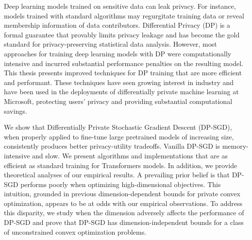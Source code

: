 
Deep learning models trained on sensitive data can leak privacy.
For instance, models trained with standard algorithms may regurgitate training data or reveal membership information of data contributors.
Differential Privacy (DP) is a formal guarantee that provably limits privacy leakage and has become the gold standard for privacy-preserving statistical data analysis.
However, most approaches for training deep learning models with DP were computationally intensive and incurred substantial performance penalties on the resulting model.
This thesis presents improved techniques for DP training that are more efficient and performant.
These techniques have seen growing interest in industry and have been used in the deployments of differentially private machine learning at Microsoft, protecting users' privacy and providing substantial computational savings.

We show that Differentially Private Stochastic Gradient Descent (DP-SGD), when properly applied to fine-tune large pretrained models of increasing size, consistently produces better privacy-utility tradeoffs. Vanilla DP-SGD is memory-intensive and slow. We present algorithms and implementations that are as efficient as standard training for Transformers models.
In addition, we provide theoretical analyses of our empirical results.
A prevailing prior belief is that DP-SGD performs poorly when optimizing high-dimensional objectives. 
This intuition, grounded in previous dimension-dependent bounds for private convex optimization, appears to be at odds with our empirical observations. 
To address this disparity, we study when the dimension adversely affects the performance of DP-SGD and prove that DP-SGD has dimension-independent bounds for a class of unconstrained convex optimization problems. 
